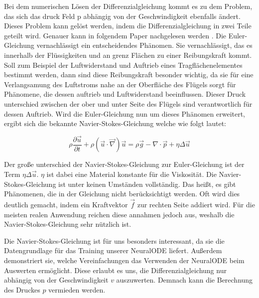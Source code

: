Bei dem numerischen Lösen der Differenzialgleichung kommt es zu dem Problem, das sich das druck Feld p
abhängig von der Geschwindigkeit ebenfalls ändert.
Dieses Problem kann gelöst werden, indem die Differenzialgleichung in zwei Teile geteilt wird.
Genauer kann in folgendem Paper nachgelesen werden \cite{num_navier}.
Die Euler-Gleichung vernachlässigt ein entscheidendes Phänomen.
Sie vernachlässigt, das es innerhalb der Flüssigkeiten und an grenz Flächen zu einer Reibungskraft kommt.
Soll zum Beispiel der Luftwiderstand und Auftrieb eines Tragflächenelementes bestimmt werden,
dann sind diese Reibungskraft besonder wichtig, da sie für eine Verlangsamung des Luftstroms nahe an der Oberfläche
des Flügels sorgt für Phänomene, die dessen auftrieb und Luftwiderstand beeinflussen.
Dieser Druck unterschied zwischen der ober und unter Seite des Flügels sind verantwortlich für dessen Auftrieb.
Wird die Euler-Gleichung nun um dieses Phänomen erweitert, ergibt sich die bekannte Navier-Stokes-Gleichung \cite[Kapitel~1.4]{navier_stokes} 
welche wie folgt lautet:

$$
\rho \frac{\partial \vec{u}}{\partial t} + \rho (\vec{u} \cdot \vec{\nabla} ) \vec{u} = 
\rho \vec{g} - \nabla \cdot \vec{p} + \eta \Delta \vec{u}
$$

Der große unterschied der Navier-Stokes-Gleichung zur Euler-Gleichung ist der Term $\eta \Delta \vec{u}$.
$\eta$ ist dabei eine Material konstante für die Viskosität.
Die Navier-Stokes-Gleichung ist unter keinen Umständen vollständig.
Das heißt, es gibt Phänomenen, die in der Gleichung nicht berücksichtigt werden.
Oft wird dies deutlich gemacht, indem ein Kraftvektor $\vec{f}$ zur rechten Seite addiert wird.
Für die meisten realen Anwendung reichen diese annahmen jedoch aus, weshalb die Navier-Stokes-Gleichung sehr nützlich ist.

Die Navier-Stokes-Gleichung ist für uns besonders interessant, da sie die Datengrundlage für das Training unserer NeuralODE liefert.
Außerdem demonstriert sie, welche Vereinfachungen das Verwenden der NeuralODE beim Auswerten ermöglicht.
Diese erlaubt es uns, die Differenzialgleichung nur abhängig von der Geschwindigkeit $v$ auszuwerten.
Demnach kann die Berechnung des Druckes $p$ vermieden werden.

